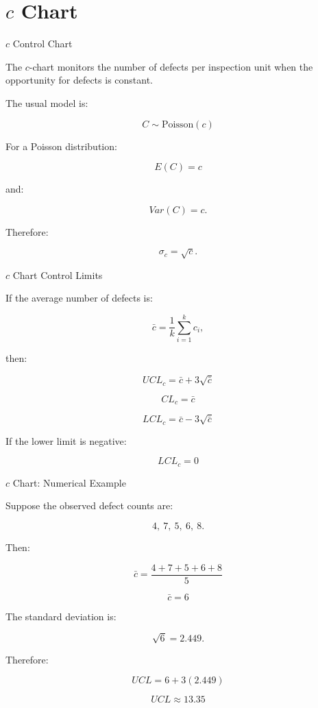 \documentclass[aspectratio=169,10pt]{beamer}
\begin{document}

\section{$c$ Chart}

\begin{frame}[shrink=18]{$c$ Control Chart}
\small

The \(c\)-chart monitors the number of defects per inspection unit
when the opportunity for defects is constant.

The usual model is:

\[
\boxed{
C\sim\mathrm{Poisson}(c)
}
\]

For a Poisson distribution:

\[
E(C)=c
\]

and:

\[
Var(C)=c.
\]

Therefore:

\[
\sigma_c=\sqrt c.
\]

\end{frame}


\begin{frame}[shrink=18]{$c$ Chart Control Limits}
\small

If the average number of defects is:

\[
\bar c=
\frac{1}{k}\sum_{i=1}^{k}c_i,
\]

then:

\[
\boxed{
UCL_c=\bar c+3\sqrt{\bar c}
}
\]

\[
\boxed{
CL_c=\bar c
}
\]

\[
\boxed{
LCL_c=\bar c-3\sqrt{\bar c}
}
\]

If the lower limit is negative:

\[
\boxed{
LCL_c=0
}
\]

\end{frame}


\begin{frame}[shrink=18]{$c$ Chart: Numerical Example}
\small

Suppose the observed defect counts are:

\[
4,\ 7,\ 5,\ 6,\ 8.
\]

Then:

\[
\bar c=
\frac{4+7+5+6+8}{5}
\]

\[
\boxed{
\bar c=6
}
\]

The standard deviation is:

\[
\sqrt 6=2.449.
\]

Therefore:

\[
UCL=6+3(2.449)
\]

\[
\boxed{
UCL\approx13.35
}
\]

\end{frame}
\end{document}
